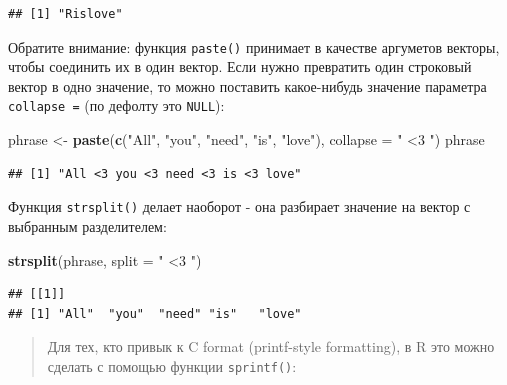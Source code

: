 \documentclass[]{book}
\newenvironment{Shaded}{\begin{snugshade}}{\end{snugshade}}
\newcommand{\KeywordTok}[1]{\textcolor[rgb]{0.13,0.29,0.53}{\textbf{#1}}}
\newcommand{\DataTypeTok}[1]{\textcolor[rgb]{0.13,0.29,0.53}{#1}}
\newcommand{\DecValTok}[1]{\textcolor[rgb]{0.00,0.00,0.81}{#1}}
\newcommand{\StringTok}[1]{\textcolor[rgb]{0.31,0.60,0.02}{#1}}
\newcommand{\NormalTok}[1]{#1}
\begin{document}
\begin{verbatim}
## [1] "Rislove"
\end{verbatim}

Обратите внимание: функция \texttt{paste()} принимает в качестве
аргуметов векторы, чтобы соединить их в один вектор. Если нужно
превратить один строковый вектор в одно значение, то можно поставить
какое-нибудь значение параметра \texttt{collapse\ =} (по дефолту это
\texttt{NULL}):

\begin{Shaded}
\begin{Highlighting}[]
\NormalTok{phrase <-}\StringTok{ }\KeywordTok{paste}\NormalTok{(}\KeywordTok{c}\NormalTok{(}\StringTok{"All"}\NormalTok{, }\StringTok{"you"}\NormalTok{, }\StringTok{"need"}\NormalTok{, }\StringTok{"is"}\NormalTok{, }\StringTok{"love"}\NormalTok{), }\DataTypeTok{collapse =} \StringTok{" <3 "}\NormalTok{)}
\NormalTok{phrase}
\end{Highlighting}
\end{Shaded}

\begin{verbatim}
## [1] "All <3 you <3 need <3 is <3 love"
\end{verbatim}

Функция \texttt{strsplit()} делает наоборот - она разбирает значение на
вектор с выбранным разделителем:

\begin{Shaded}
\begin{Highlighting}[]
\KeywordTok{strsplit}\NormalTok{(phrase, }\DataTypeTok{split =} \StringTok{" <3 "}\NormalTok{)}
\end{Highlighting}
\end{Shaded}

\begin{verbatim}
## [[1]]
## [1] "All"  "you"  "need" "is"   "love"
\end{verbatim}

\begin{quote}
Для тех, кто привык к C format (printf-style formatting), в R это можно
сделать с помощью функции \texttt{sprintf()}:
\end{quote}

\begin{Shaded}
\end{Shaded}
\end{document}
